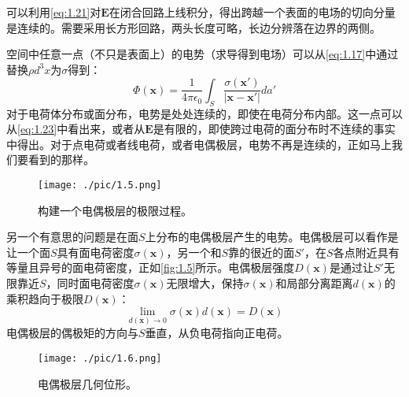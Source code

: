 \documentclass[12pt]{book}
\numberwithin{equation}{chapter}
\numberwithin{figure}{chapter}
\numberwithin{footnote}{page}
\begin{document}
可以利用\autoref{eq:1.21}对$\mathbf{E}$在闭合回路上线积分，得出跨越一个表面的电场的切向分量是连续的。需要采用长方形回路，两头长度可略，长边分辨落在边界的两侧。

空间中任意一点（不只是表面上）的电势（求导得到电场）可以从\autoref{eq:1.17}中通过替换$\rho d^3x$为$\sigma$得到：
\begin{equation}\label{eq:1.23}
    \Phi(\mathbf{x})=\frac{1}{4\pi\epsilon_0}\int_S\frac{\sigma(\mathbf{x'})}{|\mathbf{x}-\mathbf{x'}|}da'
\end{equation}
对于电荷体分布或面分布，电势是处处连续的，即使在电荷分布内部。这一点可以从\autoref{eq:1.23}中看出来，或者从$\mathbf{E}$是有限的，即使跨过电荷的面分布时不连续的事实中得出。对于点电荷或者线电荷，或者电偶极层，电势不再是连续的，正如马上我们要看到的那样。

\begin{figure}[!ht]
    \centering
    \texttt{[image: ./pic/1.5.png]}
    \captionsetup{justification=raggedright, singlelinecheck=false}
    \caption{构建一个电偶极层的极限过程。}
    \label{fig:1.5}
\end{figure}

另一个有意思的问题是在面$S$上分布的电偶极层产生的电势。电偶极层可以看作是让一个面$S$具有面电荷密度$\sigma(\mathbf{x})$，另一个和$S$靠的很近的面$S'$，在$S$各点附近具有等量且异号的面电荷密度，正如\autoref{fig:1.5}所示。电偶极层强度$D(\mathbf{x})$是通过让$S'$无限靠近$S$，同时面电荷密度$\sigma(\mathbf{x})$无限增大，保持$\sigma(\mathbf{x})$和局部分离距离$d(\mathbf{x})$的乘积趋向于极限$D(\mathbf{x})$：
$$\lim_{d(\mathbf{x})\to 0}\sigma(\mathbf{x})d(\mathbf{x})=D(\mathbf{x})$$
电偶极层的偶极矩的方向与$S$垂直，从负电荷指向正电荷。

\begin{figure}[!ht]
    \centering
    \texttt{[image: ./pic/1.6.png]}
    \captionsetup{justification=raggedright, singlelinecheck=false}
    \caption{电偶极层几何位形。}
    \label{fig:1.6}
\end{figure}
\end{document}
